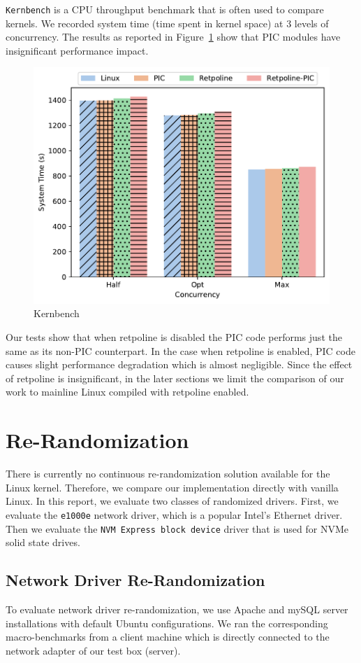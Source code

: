 \verb|Kernbench| is a CPU throughput benchmark that is often used to compare kernels. We recorded system time (time spent in kernel space) at 3 levels of concurrency. The results as reported in Figure~\ref{fig:kernbench} show that PIC modules have insignificant performance impact.

\begin{figure}[ht!]
\centering
\includegraphics[width=0.7\columnwidth]{charts/kernbench.pdf}
\caption{Kernbench}
\label{fig:kernbench}
\end{figure}

Our tests show that when retpoline is disabled the PIC code performs just the same as its non-PIC counterpart. In the case when retpoline is enabled, PIC code causes slight performance degradation which is almost negligible. Since the effect of retpoline is insignificant, in the later sections we limit the comparison of our work to mainline Linux compiled with retpoline enabled.

\section{Re-Randomization}
\label{sec:eval:rand}
There is currently no continuous re-randomization solution available for the Linux kernel. Therefore, we compare our implementation directly with vanilla Linux. In this report, we evaluate two classes of randomized drivers. First, we evaluate the \verb|e1000e| network driver, which is a popular Intel's Ethernet driver. Then we evaluate the \verb|NVM Express block device| driver that is used for NVMe solid state drives.

\subsection{Network Driver Re-Randomization}
To evaluate network driver re-randomization, we use Apache and mySQL server installations with default Ubuntu configurations. We ran the corresponding macro-benchmarks from a client machine which is directly connected to the network adapter of our test box (server).

